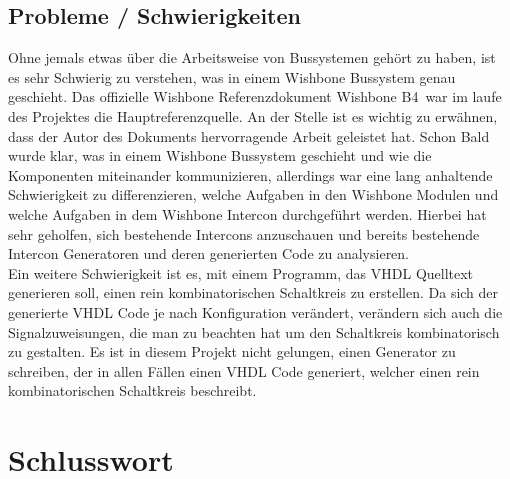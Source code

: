 \documentclass{article}
\begin{document}
\subsection{Probleme / Schwierigkeiten}
Ohne jemals etwas über die Arbeitsweise von Bussystemen gehört zu haben, ist es sehr Schwierig zu verstehen, was in einem Wishbone Bussystem genau geschieht. Das offizielle Wishbone Referenzdokument \glqq Wishbone B4\grqq\ war im laufe des Projektes die Hauptreferenzquelle. An der Stelle ist es wichtig zu erwähnen, dass der Autor des Dokuments hervorragende Arbeit geleistet hat. Schon Bald wurde klar, was in einem Wishbone Bussystem geschieht und wie die Komponenten miteinander kommunizieren, allerdings war eine lang anhaltende Schwierigkeit zu differenzieren, welche Aufgaben in den Wishbone Modulen und welche Aufgaben in dem Wishbone Intercon durchgeführt werden. Hierbei hat sehr geholfen, sich bestehende Intercons anzuschauen und bereits bestehende Intercon Generatoren und deren generierten Code zu analysieren. \\
Ein weitere Schwierigkeit ist es, mit einem Programm, das VHDL Quelltext generieren soll, einen rein kombinatorischen Schaltkreis zu erstellen. Da sich der generierte VHDL Code je nach Konfiguration verändert, verändern sich auch die Signalzuweisungen, die man zu beachten hat um den Schaltkreis kombinatorisch zu gestalten. Es ist in diesem Projekt nicht gelungen, einen Generator zu schreiben, der in allen Fällen einen VHDL Code generiert, welcher einen rein kombinatorischen Schaltkreis beschreibt.
\section{Schlusswort}
\end{document}
